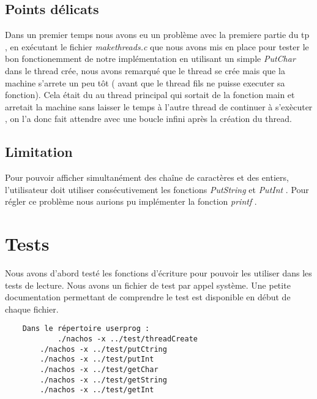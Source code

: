 \documentclass[12pt, a4paper]{report}
\begin{document}
	\section{Points délicats}
	Dans un premier temps nous avons eu un problème avec la premiere partie du tp , en exécutant le fichier  \textit{ makethreads.c } que nous avons mis en place pour tester le bon fonctionemment de notre implémentation en utilisant un simple  \textit{ PutChar } dans le thread crée, nous avons remarqué que le thread se crée mais que la machine s'arrete un peu tôt ( avant que le thread fils ne puisse executer sa fonction). Cela était du au thread principal qui sortait de la fonction main et arretait la machine sans laisser le temps à l'autre thread de continuer à s'exècuter , on l'a donc fait attendre avec une boucle infini après la création du thread.
	\paragraph{}

		\section{Limitation}

	Pour pouvoir afficher simultanément des chaîne de caractères et des entiers, l'utilisateur doit utiliser consécutivement les fonctions \textit{ PutString } et \textit{ PutInt }. Pour régler ce problème nous aurions pu implémenter la fonction \textit{ printf }.
	
\chapter{Tests}
	Nous avons d'abord testé les fonctions d'écriture pour pouvoir les utiliser dans les tests de lecture. Nous avons un fichier de test par appel système. Une petite documentation permettant de comprendre le test est disponible en début de chaque fichier.\\
	\begin{verbatim}
	Dans le répertoire userprog :
   	        ./nachos -x ../test/threadCreate
   		./nachos -x ../test/putCtring
   		./nachos -x ../test/putInt
   		./nachos -x ../test/getChar
   		./nachos -x ../test/getString
   		./nachos -x ../test/getInt
	\end{verbatim}
\end{document}
